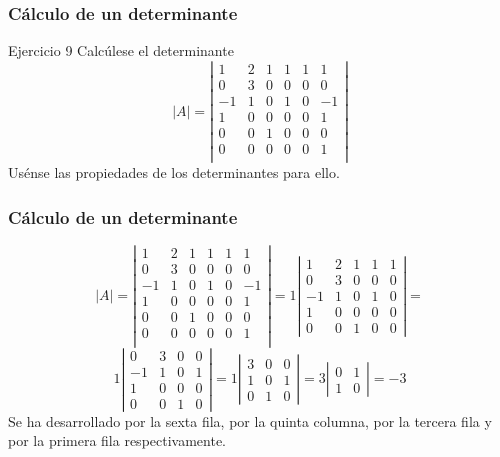 \documentclass[12pt]{article}
\begin{document}
\begin{frame}
  \frametitle{C\'alculo de un determinante}
     \begin{block}{Ejercicio 9}
Calc\'ulese el determinante
\[|A| = \left|\begin{array}{cccccc}1 & 2 & 1 &1&1&1 \\ 0 & 3 & 0 &0&0&0 \\ -1 & 1 & 0 &1&0&-1 \\
1 & 0 & 0 &0&0&1 \\ 0 & 0 &1 &0&0&0 \\  0 & 0 & 0 &0&0&1 \\ \end{array}\right|\]
Us\'ense las propiedades de los determinantes para ello.
\end{block}
\end{frame} 

\begin{frame}
  \frametitle{C\'alculo de un determinante}
\[|A| = \left|\begin{array}{cccccc}1 & 2 & 1 &1&1&1 \\ 0 & 3 & 0 &0&0&0 \\ -1 & 1 & 0 &1&0&-1 \\1 & 0 & 0 &0&0&1 \\ 0 & 0 &1 &0&0&0 \\  0 & 0 & 0 &0&0&1 \\ \end{array}\right| = 1\left|\begin{array}{ccccc}1 & 2 & 1 &1&1 \\ 0 & 3 & 0 &0&0 \\ -1 & 1 & 0 &1&0 \\1 & 0 & 0 &0&0 \\ 0 & 0 &1 &0&0 \end{array}\right| =\]\[ 1\left|\begin{array}{ccccc} 0 & 3 & 0 &0 \\ -1 & 1 & 0 &1 \\1 & 0 & 0 &0 \\ 0 & 0 &1 &0 \end{array}\right| = 1\left|\begin{array}{ccccc}  3 & 0 &0 \\  1 & 0 &1 \\ 0 &1 &0 \end{array}\right| = 3\left|\begin{array}{ccccc}   0 &1 \\ 1 &0 \end{array}\right| = -3 \]
Se ha desarrollado por la sexta fila, por la quinta columna, por la tercera fila y por la primera fila respectivamente.
\end{frame} 
\end{document}
